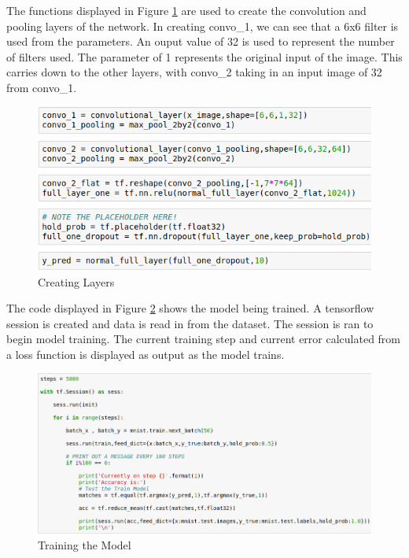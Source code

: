 \documentclass[12pt]{report}
\begin{document}
\begin{flushleft}
The functions displayed in Figure \ref{fig:layers} are used to create the convolution and pooling layers of the network. In creating convo\_1, we can see that a 6x6 filter is used from the parameters. An ouput value of 32 is used to represent the number of filters used. The parameter of 1 represents the original input of the image. This carries down to the other layers, with convo\_2 taking in an input image of 32 from convo\_1.
\end{flushleft}

\vspace{0.5cm}
\begin{figure}[ht!]
	\centering
	\includegraphics[width=12cm]{layers}
	\caption{Creating Layers}
	\label{fig:layers}
\end{figure}

\begin{flushleft}
The code displayed in Figure \ref{fig:training} shows the model being trained. A tensorflow session is created and data is read in from the dataset. The session is ran to begin model training. The current training step and current error calculated from a loss function is displayed as output as the model trains.
\end{flushleft}

\vspace{0.5cm}
\begin{figure}[ht!]
	\centering
	\includegraphics[width=12cm]{training}
	\caption{Training the Model}
	\label{fig:training}
\end{figure}
\end{document}
